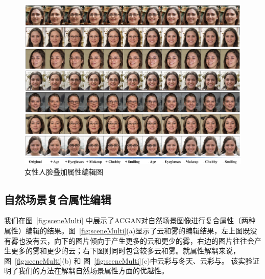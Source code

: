 \begin{figure}[!t]
     \begin{center}
          \includegraphics[width=0.95\linewidth]{figures/ACGAN//female.pdf}
     \end{center}
     \caption{女性人脸叠加属性编辑图}
     \label{fig:female}
\end{figure}


\subsection{自然场景复合属性编辑}
我们在图~\ref{fig:sceneMulti} 中展示了ACGAN对自然场景图像进行复合属性（两种属性）编辑的结果。图~\ref{fig:sceneMulti}(a)显示了云和雾的编辑结果，左上图既没有雾也没有云，向下的图片倾向于产生更多的云和更少的雾，右边的图片往往会产生更多的雾和更少的云；右下图则同时包含较多云和雾。就属性解耦来说，图~\ref{fig:sceneMulti}(b) 和 图~\ref{fig:sceneMulti}(c)中云彩与冬天、云彩与。 该实验证明了我们的方法在解耦自然场景属性方面的优越性。

